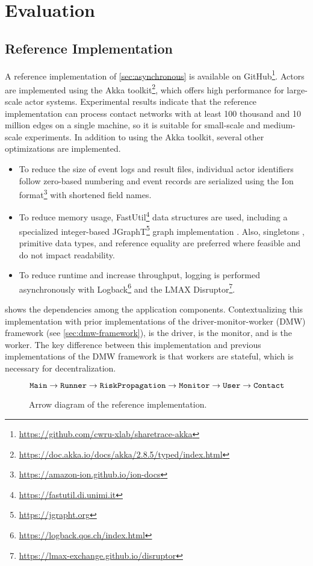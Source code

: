 \chapter{Evaluation}\label{ch:evaluation}

\section{Reference Implementation}

A reference implementation of \cref{sec:asynchronous} is available on GitHub\footnote{\url{https://github.com/cwru-xlab/sharetrace-akka}}. Actors are implemented using the Akka toolkit\footnote{\url{https://doc.akka.io/docs/akka/2.8.5/typed/index.html}}, which offers high performance for large-scale actor systems. Experimental results indicate that the reference implementation can process contact networks with at least 100 thousand \verticesName and 10 million edges on a single machine, so it is suitable for small-scale and medium-scale experiments. In addition to using the Akka toolkit, several other optimizations are implemented.
\begin{itemize}
  \item To reduce the size of event logs and result files, individual actor identifiers follow zero-based numbering and event records are serialized using the Ion format\footnote{\url{https://amazon-ion.github.io/ion-docs}} with shortened field names.
  \item To reduce memory usage, FastUtil\footnote{\url{https://fastutil.di.unimi.it}} data structures are used, including a specialized integer-based JGraphT\footnote{\url{https://jgrapht.org}} graph implementation \citep{Michail2020}. Also, singletons \citep{Gamma1995}, primitive data types, and reference equality are preferred where feasible and do not impact readability.
  \item To reduce runtime and increase throughput, logging is performed asynchronously with Logback\footnote{\url{https://logback.qos.ch/index.html}} and the LMAX Disruptor\footnote{\url{https://lmax-exchange.github.io/disruptor}}.
\end{itemize}

 shows the dependencies among the application components. Contextualizing this implementation with prior implementations of the driver-monitor-worker (DMW) framework (see \cref{sec:dmw-framework}),  is the driver,  is the monitor, and  is the worker. The key difference between this implementation and previous implementations of the DMW framework is that workers are stateful, which is necessary for decentralization.
\begin{figure}[htbp]
\begin{equation*}
  \texttt{Main} \rightarrow \texttt{Runner} \rightarrow \texttt{RiskPropagation} \rightarrow \texttt{Monitor} \rightarrow \texttt{User} \rightarrow \texttt{Contact}
\end{equation*}
\caption[Arrow diagram of the reference implementation]{Arrow diagram of the reference implementation.}
\label{fig:arrow-diagram}
\end{figure}

